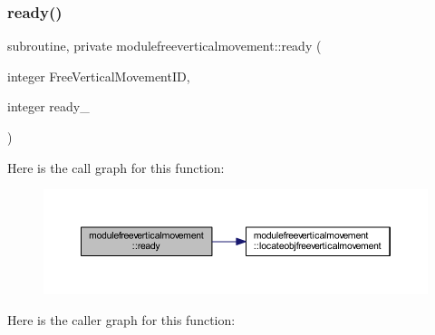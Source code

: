 \subsubsection{\texorpdfstring{ready()}{ready()}}
{\footnotesize\ttfamily subroutine, private modulefreeverticalmovement\+::ready (\begin{DoxyParamCaption}\item[{integer}]{Free\+Vertical\+Movement\+ID,  }\item[{integer}]{ready\+\_\+ }\end{DoxyParamCaption})\hspace{0.3cm}{\ttfamily [private]}}

Here is the call graph for this function\+:\nopagebreak
\begin{figure}[H]
\begin{center}
\leavevmode
\includegraphics[width=350pt]{namespacemodulefreeverticalmovement_a6822a6ac8c2596feb6110b6fa936b42b_cgraph}
\end{center}
\end{figure}
Here is the caller graph for this function\+:\nopagebreak
